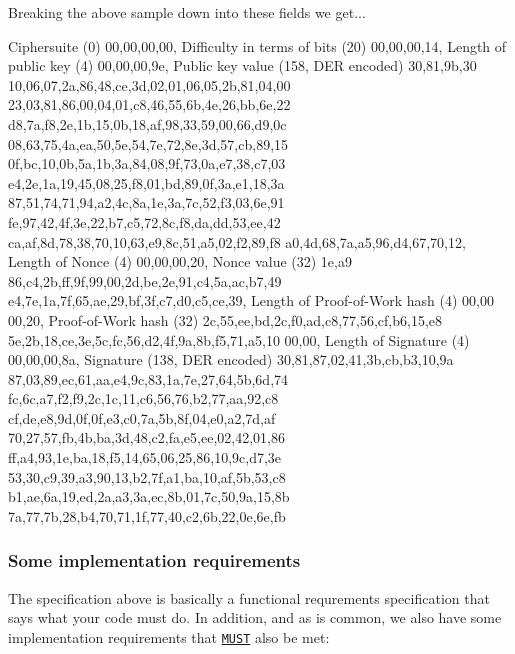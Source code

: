 Breaking the above sample down into these fields we get... \begin{DoxyVerb}    Ciphersuite (0)
    00,00,00,00,
    Difficulty in terms of bits (20)
                00,00,00,14,
    Length of public key (4)
                            00,00,00,9e,
    Public key value (158, DER encoded)
                                        30,81,9b,30
    10,06,07,2a,86,48,ce,3d,02,01,06,05,2b,81,04,00
    23,03,81,86,00,04,01,c8,46,55,6b,4e,26,bb,6e,22
    d8,7a,f8,2e,1b,15,0b,18,af,98,33,59,00,66,d9,0c
    08,63,75,4a,ea,50,5e,54,7e,72,8e,3d,57,cb,89,15
    0f,bc,10,0b,5a,1b,3a,84,08,9f,73,0a,e7,38,c7,03
    e4,2e,1a,19,45,08,25,f8,01,bd,89,0f,3a,e1,18,3a
    87,51,74,71,94,a2,4c,8a,1e,3a,7c,52,f3,03,6e,91
    fe,97,42,4f,3e,22,b7,c5,72,8c,f8,da,dd,53,ee,42
    ca,af,8d,78,38,70,10,63,e9,8c,51,a5,02,f2,89,f8
    a0,4d,68,7a,a5,96,d4,67,70,12,
    Length of Nonce (4)
                                  00,00,00,20,
    Nonce value (32)
                                              1e,a9
    86,c4,2b,ff,9f,99,00,2d,be,2e,91,c4,5a,ac,b7,49
    e4,7e,1a,7f,65,ae,29,bf,3f,c7,d0,c5,ce,39,
    Length of Proof-of-Work hash (4)
                                              00,00
    00,20,
    Proof-of-Work hash (32)
          2c,55,ee,bd,2c,f0,ad,c8,77,56,cf,b6,15,e8
    5e,2b,18,ce,3e,5c,fc,56,d2,4f,9a,8b,f5,71,a5,10
    00,00,
    Length of Signature (4)
          00,00,00,8a,
    Signature (138, DER encoded)
                      30,81,87,02,41,3b,cb,b3,10,9a
    87,03,89,ec,61,aa,e4,9c,83,1a,7e,27,64,5b,6d,74
    fc,6c,a7,f2,f9,2c,1c,11,c6,56,76,b2,77,aa,92,c8
    cf,de,e8,9d,0f,0f,e3,c0,7a,5b,8f,04,e0,a2,7d,af
    70,27,57,fb,4b,ba,3d,48,c2,fa,e5,ee,02,42,01,86
    ff,a4,93,1e,ba,18,f5,14,65,06,25,86,10,9c,d7,3e
    53,30,c9,39,a3,90,13,b2,7f,a1,ba,10,af,5b,53,c8
    b1,ae,6a,19,ed,2a,a3,3a,ec,8b,01,7c,50,9a,15,8b
    7a,77,7b,28,b4,70,71,1f,77,40,c2,6b,22,0e,6e,fb
\end{DoxyVerb}


\subsubsection*{Some implementation requirements}

The specification above is basically a functional requrements specification that says what your code must do. In addition, and as is common, we also have some implementation requirements that \href{https://tools.ietf.org/html/rfc2119}{\tt M\+U\+ST} also be met\+:


